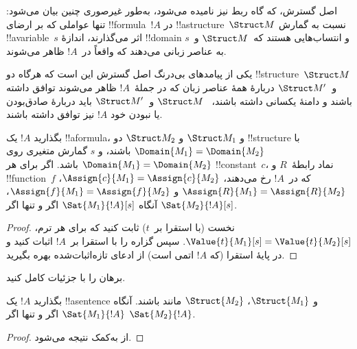 \documentclass[../../../include/open-logic-section]{subfiles}
\begin{document}


\begin{explain}
اصل گسترش، که گاه ربط نیز نامیده می‌شود، به‌طور غیرصوری چنین بیان می‌شود:
تنها عواملی که بر ارضای !!{formula}~$!A$ در !!a{structure}~$\Struct M$
نسبت به گمارش !!a{variable}~$s$ اثر می‌گذارند، اندازهٔ !!{domain} و
انتساب‌هایی هستند که~$\Struct M$ و~$s$ به عناصر زبانی می‌دهند که واقعاً
در~$!A$ ظاهر می‌شوند.

یکی از پیامدهای بی‌درنگ اصل گسترش این است که هرگاه دو
!!{structure}~$\Struct M$ و~$\Struct M'$ دربارهٔ همهٔ عناصر زبان که در
جملهٔ~$!A$ ظاهر می‌شوند توافق داشته باشند و دامنهٔ یکسانی داشته باشند،
~$\Struct M$ و~$\Struct M'$ باید دربارهٔ صادق‌بودن یا نبودن خود $!A$ نیز
توافق داشته باشند.
\end{explain}

\begin{prop}
  بگذارید $!A$ یک !!a{formula}، و $\Struct M_1$ و $\Struct M_2$ دو
  !!{structure} با $\Domain{M_1} = \Domain{M_2}$ باشند، و $s$ گمارش
  متغیری روی $\Domain{M_1} = \Domain{M_2}$ باشد. اگر برای هر
  !!{constant}~$c$، نماد رابطهٔ~$R$ و !!{function}~$f$ که در~$!A$ رخ
  می‌دهند، $\Assign{c}{M_1} = \Assign{c}{M_2}$،
  $\Assign{R}{M_1}=\Assign{R}{M_2}$ و
  $\Assign{f}{M_1} = \Assign{f}{M_2}$، آنگاه
  $\Sat{M_1}{!A}[s]$ اگر و تنها اگر $\Sat{M_2}{!A}[s]$.
\end{prop}

\begin{proof}
  نخست (با استقرا بر~$t$) ثابت کنید که برای هر ترم،
  $\Value{t}{M_1}[s] = \Value{t}{M_2}[s]$. سپس گزاره را با استقرا
  بر~$!A$ اثبات کنید و در پایهٔ استقرا (که $!A$ اتمی است) از ادعای
  تازه‌اثبات‌شده بهره بگیرید.
\end{proof}

\begin{prob}
برهان  را با جزئیات کامل کنید.
\end{prob}

\begin{cor}
  بگذارید $!A$ یک !!a{sentence} و $\Struct{M_1}$، $\Struct{M_2}$ مانند
   باشند. آنگاه $\Sat{M_1}{!A}$ اگر و تنها
  اگر $\Sat{M_2}{!A}$.
\end{cor}

\begin{proof}
از  به‌کمک
 نتیجه می‌شود.
\end{proof}
\end{document}
